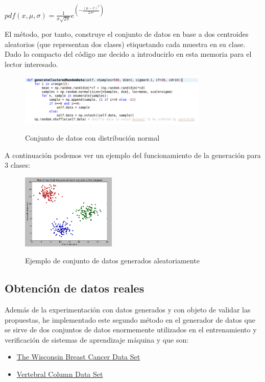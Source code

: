 \documentclass[10pt,a4paper]{report}
\begin{document}
\begin{center}
$pdf(x,\mu,\sigma) = \frac{1}{ \sigma \sqrt{2 \pi}} e^{\left(-\frac{{\left(\mu - x\right)}^{2}}{2 \, \sigma^{2}}\right)}$
\end{center}

El método, por tanto, construye el conjunto de datos en base a dos centroides aleatorios (que representan dos clases) etiquetando cada muestra en su clase. Dado lo compacto del código me decido a introducirlo en esta memoria para el lector interesado.
\begin{figure}[!h]{}
    \centering
    \includegraphics[width=0.8\textwidth]{img/generateClusteredRandomData.png}
    \label{fig:generateRandomMethod}
    \caption{Conjunto de datos con distribución normal}
\end{figure}

A continuación podemos ver un ejemplo del funcionamiento de la generación para 3 clases:
\begin{figure}[!h]{}
    \centering
    \includegraphics[width=0.4\textwidth]{img/clusteredData1.png}
    \label{fig:clusteredData1}
    \caption{Ejemplo de conjunto de datos generados aleatoriamente}
\end{figure}

\subsection{Obtención de datos reales}
Además de la experimentación con datos generados y con objeto de validar las propuestas, he implementado este segundo método en el generador de datos que se sirve de dos conjuntos de datos enormemente utilizados en el entrenamiento y verificación de sistemas de aprendizaje máquina y que son:
\begin{itemize}
	\item \href{https://archive.ics.uci.edu/ml/datasets/Breast+Cancer+Wisconsin+\%28Diagnostic\%29}{The Wisconsin Breast Cancer Data Set}
	\item \href{https://archive.ics.uci.edu/ml/datasets/Vertebral+Column}{Vertebral Column Data Set}
\end{itemize}
\end{document}

